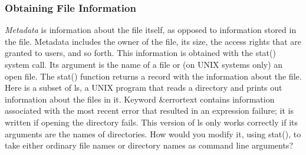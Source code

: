 \subsubsection[Obtaining File Information]{Obtaining File Information}
\textit{Metadata} is information about the file
itself, as opposed to information stored in the file. Metadata includes
the owner of the file, its size, the access rights that are granted to
users, and so forth. This information is obtained with the
\textsf{stat()} system call. Its argument is the name of
a file or (on UNIX systems only) an open file. The \textsf{stat()}
function returns a record with the information about the file. Here is
a subset of \textsf{ls}, a UNIX program that reads a directory and
prints out information about the files in it. Keyword \textsf{\&errortext} contains information associated with the
most recent error that resulted in an expression
failure; it is written if opening the directory
fails. This version of \textsf{ls} only works correctly if its
arguments are the names of directories. How would you modify it, using
\textsf{stat()}, to take either ordinary file names or directory names
as command line arguments?


